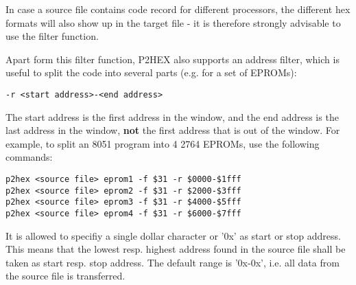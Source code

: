 \documentclass[12pt,twoside]{report}
\newcommand{\bb}[1]{{\bf #1}}
\begin{document}
\par
In case a source file contains code record for different processors,
the different hex formats will also show up in the target file - it
is therefore strongly advisable to use the filter function.

Apart form this filter function, P2HEX also supports an address
filter, which is useful to split the code into several parts (e.g.
for a set of EPROMs):
\begin{verbatim}
-r <start address>-<end address>
\end{verbatim}
The start address is the first address in the window, and the end
address is the last address in the window, \bb{not} the first address
that is out of the window.  For example, to split an 8051 program
into 4 2764 EPROMs, use the following commands:
\begin{verbatim}
p2hex <source file> eprom1 -f $31 -r $0000-$1fff
p2hex <source file> eprom2 -f $31 -r $2000-$3fff
p2hex <source file> eprom3 -f $31 -r $4000-$5fff
p2hex <source file> eprom4 -f $31 -r $6000-$7fff
\end{verbatim}
It is allowed to specifiy a single dollar character or '0x' as start
or stop address.  This means that the lowest resp. highest address found
in the source file shall be taken as start resp. stop address.  The
default range is '0x-0x', i.e. all data from the source file is
transferred.
\end{document}
